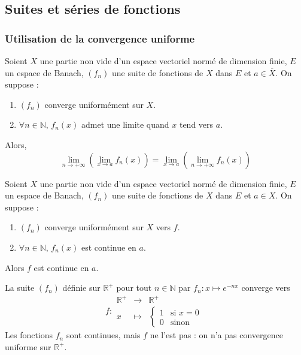 



	\subsection{Suites et séries de fonctions}
	
	\subsubsection{Utilisation de la convergence uniforme}
	
	
	\begin{theorem}
		Soient $X$ une partie non vide d'un espace vectoriel normé de dimension finie, $E$ un espace de Banach, $(f_n)$ une suite de fonctions de $X$ dans $E$ et $a \in \overline{X}$. On suppose :
		\begin{enumerate}[label=(\roman*)]
			\item $(f_n)$ converge uniformément sur $X$.
			\item $\forall n \in \mathbb{N}, \, f_n(x)$ admet une limite quand $x$ tend vers $a$.
		\end{enumerate}
		Alors,
		\[ \lim_{n \rightarrow +\infty} \left( \lim_{x \rightarrow a} f_n(x) \right) = \lim_{x \rightarrow a} \left( \lim_{n \rightarrow +\infty} f_n(x) \right) \]
	\end{theorem}
	
	\begin{theorem}
		Soient $X$ une partie non vide d'un espace vectoriel normé de dimension finie, $E$ un espace de Banach, $(f_n)$ une suite de fonctions de $X$ dans $E$ et $a \in X$. On suppose :
		\begin{enumerate}[label=(\roman*)]
			\item $(f_n)$ converge uniformément sur $X$ vers $f$.
			\item $\forall n \in \mathbb{N}, \, f_n(x)$ est continue en $a$.
		\end{enumerate}
		Alors $f$ est continue en $a$.
	\end{theorem}
	
	\begin{example}
		La suite $(f_n)$ définie sur $\mathbb{R}^+$ pour tout $n \in \mathbb{N}$ par $f_n : x \mapsto e^{-nx}$ converge vers
		\[
			f :
			\begin{array}{ccc}
				\mathbb{R}^+ &\rightarrow& \mathbb{R}^+ \\
				x &\mapsto& \begin{cases}
					1 &\text{si } x = 0 \\
					0 &\text{sinon}
				\end{cases}
			\end{array}
		\]
		Les fonctions $f_n$ sont continues, mais $f$ ne l'est pas : on n'a pas convergence uniforme sur $\mathbb{R}^+$.
	\end{example}
	

